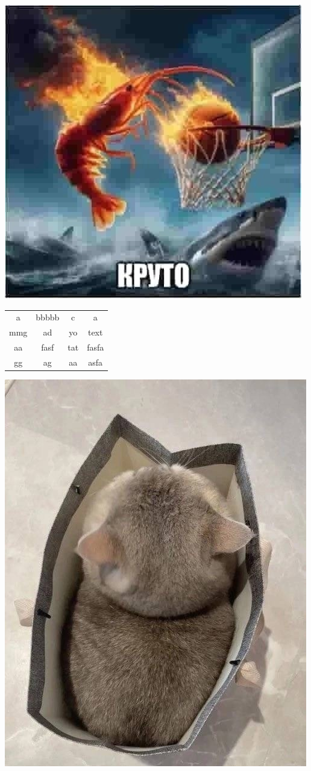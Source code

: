 \documentclass{article}
\begin{document}
\includegraphics{cool.jpg}
\begin{center}
\begin{tabular}{ |c|c|c|c| }
\hline
 a & bbbbb & c & a\\
 mmg & ad & yo & text\\
 aa & fasf & tat & fasfa\\
 gg & ag & aa & asfa\\
\hline
\end{tabular}
\end{center}

\includegraphics{cat.jpg}
\end{document}
